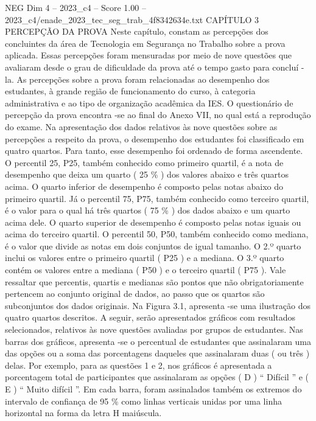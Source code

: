 \begin{textsample}{NEG Dim 4 – 2023\_c4 – Score 1.00 – 2023\_c4/enade\_2023\_tec\_seg\_trab\_4f8342634e.txt}  \label{ex:f4_neg_198}
CAPÍTULO 3 PERCEPÇÃO DA PROVA Neste capítulo, constam as percepções dos concluintes da área de Tecnologia em Segurança no Trabalho sobre a prova aplicada.
Essas percepções foram mensuradas por meio de nove questões que avaliaram desde o grau de dificuldade da prova até o tempo gasto para concluí -la.
As percepções sobre a prova foram relacionadas ao desempenho dos estudantes, à grande região de funcionamento do curso, à categoria administrativa e ao tipo de organização acadêmica da IES.
O questionário de percepção da prova encontra -se ao final do Anexo VII, no qual está a reprodução do exame.
Na apresentação dos dados relativos às nove questões sobre as percepções a respeito da prova, o desempenho dos estudantes foi classificado em quatro quartos.
Para tanto, esse desempenho foi ordenado de forma ascendente.
O percentil 25, P25, também conhecido como primeiro quartil, é a nota de desempenho que deixa um quarto ( 25 \% ) dos valores abaixo e três quartos acima.
O quarto inferior de desempenho é composto pelas notas abaixo do primeiro quartil.
Já o percentil 75, P75, também conhecido como terceiro quartil, é o valor para o qual há três quartos ( 75 \% ) dos dados abaixo e um quarto acima dele.
O quarto superior de desempenho é composto pelas notas iguais ou acima do terceiro quartil.
O percentil 50, P50, também conhecido como mediana, é o valor que divide as notas em dois conjuntos de igual tamanho.
O 2.º quarto inclui os valores entre o primeiro quartil ( P25 ) e a mediana.
O 3.º quarto contém os valores entre a mediana ( P50 ) e o terceiro quartil ( P75 ).
Vale ressaltar que percentis, quartis e medianas são pontos que não obrigatoriamente pertencem ao conjunto original de dados, ao passo que os quartos são subconjuntos dos dados originais.
Na Figura 3.1, apresenta -se uma ilustração dos quatro quartos descritos.
A seguir, serão apresentados gráficos com resultados selecionados, relativos às nove questões avaliadas por grupos de estudantes.
Nas barras dos gráficos, apresenta -se o percentual de estudantes que assinalaram uma das opções ou a soma das porcentagens daqueles que assinalaram duas ( ou três ) delas.
Por exemplo, para as questões 1 e 2, nos gráficos é apresentada a porcentagem total de participantes que assinalaram as opções ( D ) “ Difícil ” e ( E ) “ Muito difícil ”.
Em cada barra, foram assinalados também os extremos do intervalo de confiança de 95 \% como linhas verticais unidas por uma linha horizontal na forma da letra H maiúscula.

\end{textsample}
